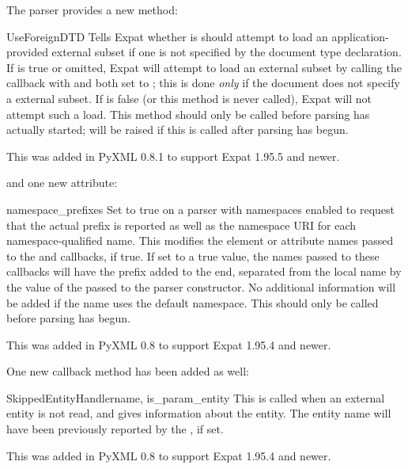 \documentclass{howto}
\begin{document}
The parser provides a new method:

\begin{methoddesc}[xmlparser]{UseForeignDTD}{}
  Tells Expat whether is should attempt to load an
  application-provided external subset if one is not specified by the
  document type declaration.  If  is true or omitted, Expat
  will attempt to load an external subset by calling the
   callback with  and
   both set to ; this is done \emph{only} if
  the document does not specify a external subset.  If  is
  false (or this method is never called), Expat will not attempt such
  a load.  This method should only be called before parsing has
  actually started;  will be raised if this is
  called after parsing has begun.

  This was added in PyXML 0.8.1 to support Expat 1.95.5 and newer.
\end{methoddesc}

and one new attribute:

\begin{memberdesc}[xmlparser]{namespace_prefixes}
  Set to true on a parser with namespaces enabled to request that the
  actual prefix is reported as well as the namespace URI for each
  namespace-qualified name.  This modifies the element or attribute
  names passed to the  and
   callbacks, if true.  If set to a true
  value, the names passed to these callbacks will have the prefix
  added to the end, separated from the local name by the value of the
   passed to the parser constructor.  No
  additional information will be added if the name uses the default
  namespace.  This should only be called before parsing has begun.

  This was added in PyXML 0.8 to support Expat 1.95.4 and newer.
\end{memberdesc}

One new callback method has been added as well:

\begin{methoddesc}[xmlparser]{SkippedEntityHandler}{name, is_param_entity}
  This is called when an external entity is not read, and gives
  information about the entity.  The entity name will have been
  previously reported by the , if set.

  This was added in PyXML 0.8 to support Expat 1.95.4 and newer.
\end{methoddesc}
\end{document}
